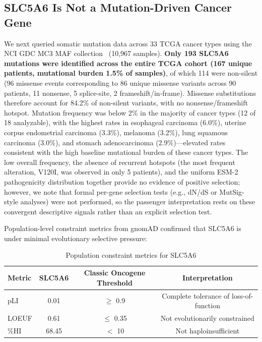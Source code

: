 \documentclass[10pt,letterpaper]{article}
\begin{document}
\subsection*{SLC5A6 Is Not a Mutation-Driven Cancer Gene}

We next queried somatic mutation data across 33 TCGA cancer types using the NCI GDC MC3 MAF collection~\cite{ellrott2018} (10,967 samples). \textbf{Only 193 SLC5A6 mutations were identified across the entire TCGA cohort (167 unique patients, mutational burden 1.5\% of samples)}, of which 114 were non-silent (96 missense events corresponding to 86 unique missense variants across 90 patients, 11 nonsense, 5 splice-site, 2 frameshift/in-frame). Missense substitutions therefore account for 84.2\% of non-silent variants, with no nonsense/frameshift hotspot. Mutation frequency was below 2\% in the majority of cancer types (12 of 18 analyzable), with the highest rates in esophageal carcinoma (6.0\%), uterine corpus endometrial carcinoma (3.3\%), melanoma (3.2\%), lung squamous carcinoma (3.0\%), and stomach adenocarcinoma (2.9\%)---elevated rates consistent with the high baseline mutational burden of these cancer types. The low overall frequency, the absence of recurrent hotspots (the most frequent alteration, V120I, was observed in only 5 patients), and the uniform ESM-2 pathogenicity distribution together provide no evidence of positive selection; however, we note that formal per-gene selection tests (e.g., dN/dS or MutSig-style analyses) were not performed, so the passenger interpretation rests on these convergent descriptive signals rather than an explicit selection test.

Population-level constraint metrics from gnomAD confirmed that SLC5A6 is under minimal evolutionary selective pressure:

\begin{table}[t]
\centering
\caption{Population constraint metrics for SLC5A6}
\label{tab:constraint}
\begin{tabular}{lccc}
\toprule
Metric & SLC5A6 & Classic Oncogene Threshold & Interpretation \\
\midrule
pLI   & 0.01  & $\ge$ 0.9  & Complete tolerance of loss-of-function \\
LOEUF & 0.61  & $\le$ 0.35 & Not evolutionarily constrained \\
\%HI  & 68.45 & $<$ 10     & Not haploinsufficient \\
\bottomrule
\end{tabular}
\end{table}
\end{document}
